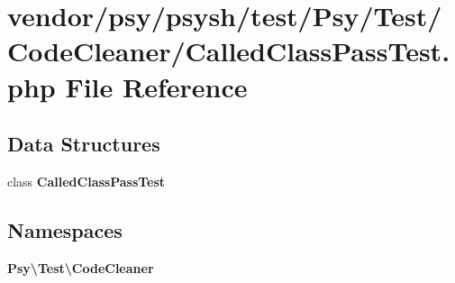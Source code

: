 \section{vendor/psy/psysh/test/\+Psy/\+Test/\+Code\+Cleaner/\+Called\+Class\+Pass\+Test.php File Reference}
\label{_called_class_pass_test_8php}
\subsection*{Data Structures}
\begin{DoxyCompactItemize}
\item 
class {\bf Called\+Class\+Pass\+Test}
\end{DoxyCompactItemize}
\subsection*{Namespaces}
\begin{DoxyCompactItemize}
\item 
 {\bf Psy\textbackslash{}\+Test\textbackslash{}\+Code\+Cleaner}
\end{DoxyCompactItemize}
